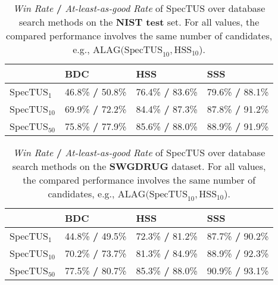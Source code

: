 \begin{table}[h!]
    \centering
    \begin{tabular}{l|l|l|l}

        ~ & BDC & HSS & SSS \\ \hline
        SpecTUS$_1$ & 46.8\% \textbf{/} 50.8\%& 76.4\% \textbf{/} 83.6\%& 79.6\% \textbf{/} 88.1\%\\ \hline
        SpecTUS$_{10}$ & 69.9\% \textbf{/} 72.2\%& 84.4\% \textbf{/} 87.3\%& 87.8\% \textbf{/} 91.2\%\\ \hline
        SpecTUS$_{50}$ & 75.8\% \textbf{/} 77.9\%& 85.6\% \textbf{/} 88.0\%& 88.9\% \textbf{/} 91.9\%\\ \hline
    \end{tabular}
    \caption{\textit{Win Rate} \textbf{/} \textit{At-least-as-good Rate} of SpecTUS over database search methods on the \textbf{NIST test} set. For all values, the compared performance involves the same number of candidates, e.g., $\text{ALAG}(\text{SpecTUS}_{10}, \text{HSS}_{10}$).}
\end{table}

\begin{table}[h!]
    \centering
    \begin{tabular}{l|l|l|l}
    
        ~ & BDC & HSS & SSS \\ \hline
        SpecTUS$_1$ & 44.8\% \textbf{/} 49.5\%& 72.3\% \textbf{/} 81.2\%& 87.7\% \textbf{/} 90.2\%\\ \hline
        SpecTUS$_{10}$ & 70.2\% \textbf{/} 73.7\%& 81.3\% \textbf{/} 84.9\%& 88.9\% \textbf{/} 92.3\%\\ \hline
        SpecTUS$_{50}$ & 77.5\% \textbf{/} 80.7\%& 85.3\% \textbf{/} 88.0\%& 90.9\% \textbf{/} 93.1\%\\ \hline
    \end{tabular}
    \caption{\textit{Win Rate} \textbf{/} \textit{At-least-as-good Rate} of SpecTUS over database search methods on the \textbf{SWGDRUG} dataset. For all values, the compared performance involves the same number of candidates, e.g., $\text{ALAG}(\text{SpecTUS}_{10}, \text{HSS}_{10}$).}
\end{table}


